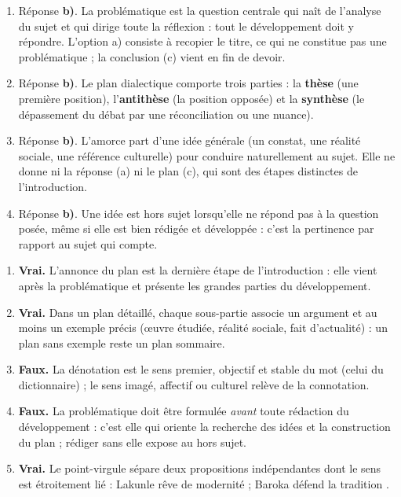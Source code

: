\documentclass[11pt]{article}
\newcommand{\cle}[1]{{\popxbold\color{popdark}#1}}
\begin{document}
\begin{corrige}
\begin{enumerate}
\item Réponse \textbf{b)}. La problématique est la \cle{question centrale} qui naît de l'analyse du sujet et qui dirige toute la réflexion : tout le développement doit y répondre. L'option a) consiste à recopier le titre, ce qui ne constitue pas une problématique ; la conclusion (c) vient en fin de devoir.
\item Réponse \textbf{b)}. Le \cle{plan dialectique} comporte trois parties : la \textbf{thèse} (une première position), l'\textbf{antithèse} (la position opposée) et la \textbf{synthèse} (le dépassement du débat par une réconciliation ou une nuance).
\item Réponse \textbf{b)}. L'\cle{amorce} part d'une idée générale (un constat, une réalité sociale, une référence culturelle) pour conduire naturellement au sujet. Elle ne donne ni la réponse (a) ni le plan (c), qui sont des étapes distinctes de l'introduction.
\item Réponse \textbf{b)}. Une idée est \cle{hors sujet} lorsqu'elle ne répond pas à la question posée, même si elle est bien rédigée et développée : c'est la pertinence par rapport au sujet qui compte.
\end{enumerate}
\end{corrige}

\begin{corrige}
\begin{enumerate}
\item \textbf{Vrai.} L'annonce du plan est la dernière étape de l'introduction : elle vient après la problématique et présente les grandes parties du développement.
\item \textbf{Vrai.} Dans un \cle{plan détaillé}, chaque sous-partie associe un argument et au moins un exemple précis (œuvre étudiée, réalité sociale, fait d'actualité) : un plan sans exemple reste un plan sommaire.
\item \textbf{Faux.} La \cle{dénotation} est le sens premier, objectif et stable du mot (celui du dictionnaire) ; le sens imagé, affectif ou culturel relève de la \cle{connotation}.
\item \textbf{Faux.} La problématique doit être formulée \emph{avant} toute rédaction du développement : c'est elle qui oriente la recherche des idées et la construction du plan ; rédiger sans elle expose au hors sujet.
\item \textbf{Vrai.} Le \cle{point-virgule} sépare deux propositions indépendantes dont le sens est étroitement lié : \og Lakunle rêve de modernité ; Baroka défend la tradition \fg.
\end{enumerate}
\end{corrige}
\end{document}
